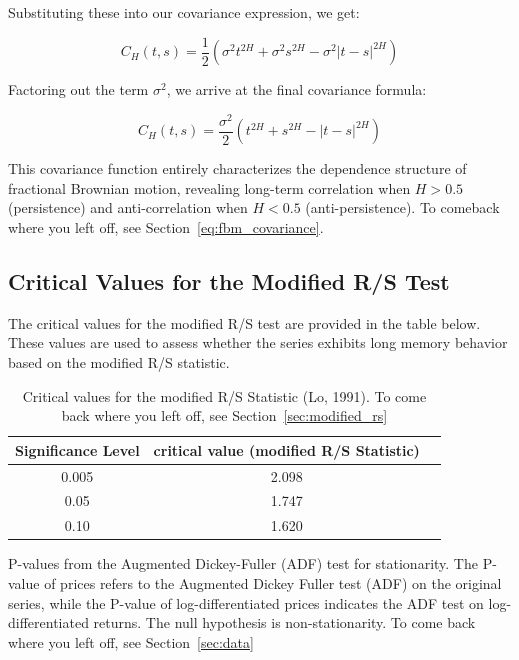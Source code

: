 \documentclass[11pt]{extarticle}
\begin{document}
Substituting these into our covariance expression, we get:

\[
C_H(t,s) = \frac{1}{2}\left(\sigma^2 t^{2H} + \sigma^2 s^{2H} - \sigma^2 |t-s|^{2H}\right)
\]


Factoring out the term \( \sigma^2 \), we arrive at the final covariance formula:

\[
\boxed{C_H(t,s) = \frac{\sigma^2}{2}\left(t^{2H} + s^{2H} - |t-s|^{2H}\right)}
\]

This covariance function entirely characterizes the dependence structure of fractional Brownian motion, revealing long-term correlation when \(H>0.5\) (persistence) and anti-correlation when \(H<0.5\) (anti-persistence).
To comeback where you left off, see Section~\ref{eq:fbm_covariance}. \\

\subsection{Critical Values for the Modified R/S Test}

The critical values for the modified R/S test are provided in the table below. These values are used to assess whether the series exhibits long memory behavior based on the modified R/S statistic.

\begin{table}[ht!]
\centering
\begin{tabular}{|c|c|c|}
\hline
\textbf{Significance Level} & \textbf{critical value (modified R/S Statistic)} \\
\hline
0.005 & 2.098\\
0.05 & 1.747\\
0.10 & 1.620\\

\hline
\end{tabular}
\caption{Critical values for the modified R/S Statistic (Lo, 1991). To come back where you left off, see Section~\ref{sec:modified_rs}}
    \label{table:critical_values}
\end{table}

\begin{table}[h!]
    \centering
    \caption{P-values from the Augmented Dickey-Fuller (ADF) test for stationarity. The P-value of prices refers to the Augmented Dickey Fuller test (ADF) on the original series,
     while the P-value of log-differentiated prices indicates the ADF test on log-differentiated returns. The null hypothesis is non-stationarity.
    To come back where you left off, see Section~\ref{sec:data}}
    \label{table:adf_results}
\end{table}
\end{document}
